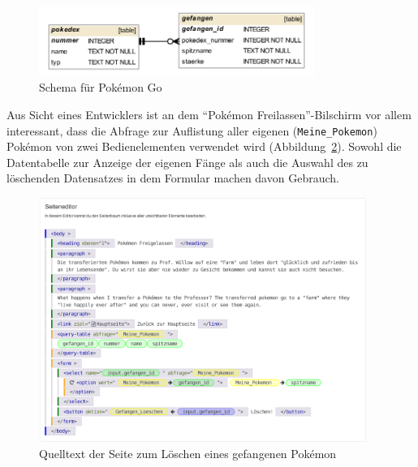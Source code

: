 \begin{figure}[h]
  \centering \includegraphics[width=0.8\textwidth]{images/db-schema/pokemongo}
  \caption{Schema für Pokémon Go}
  \label{fig:project-pokemongo-schema}
\end{figure}

Aus Sicht eines Entwicklers ist an dem "`Pokémon Freilassen"'-Bilschirm vor allem interessant, dass die Abfrage zur Auflistung aller eigenen (\texttt{Meine\_Pokemon}) Pokémon von zwei Bedienelementen verwendet wird (Abbildung~\ref{fig:project-pokemongo-page-delete}). Sowohl die Datentabelle zur Anzeige der eigenen Fänge als auch die Auswahl des zu löschenden Datensatzes in dem Formular machen davon Gebrauch.

\begin{figure}[h]
  \centering \includegraphics[width=0.95\textwidth]{images/screenshots/20161019/editor-project-pokemongo-page-delete.png}
  \caption{Quelltext der Seite zum Löschen eines gefangenen Pokémon}
  \label{fig:project-pokemongo-page-delete}
\end{figure}

